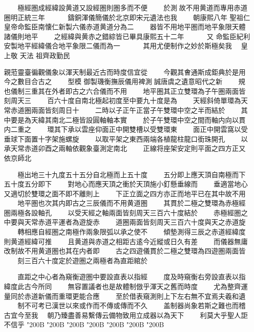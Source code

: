 \begin{正文}
　　極經圏成經緯設黄道又設經圏則圏多而不便
　　於測𠉀故不用黄道而專用赤道圈明正統三年
　　　鑄銅渾儀簡儀於北京即宋元遺法也我
　　朝康熙八年
聖祖仁皇帝命監臣南懐仁新製六儀赤道黄道分為二
　　器皆不用地平圏而地平象限天體諸儀則地平
　　之經緯與黄赤之錯綜皆已畢具康熙五十二年
　　　又
命監臣紀利安製地平經緯儀合地平象限二儀而為一
　　　其用尤便制作之妙於斯極矣我
　皇上敬
天法
祖齊政勤民
\par
親蒞靈臺徧觀儀象以渾天制最近古而時度信宜從
　　今觀其㑹通斯成鉅典於是用今之數目合古之
　　型模
御製璣衡撫辰儀用裨測𠉀誠唐虞之遺意昭代之新
　　規也儀制三重其在外者即古之六合儀而不用
　　地平圏其正立雙環為子午圏兩面皆刻周天三
　　百六十度自南北極起初度至中要九十度是為
　　天經斜倚單環為天常赤道圏兩面皆刻周日十
　　二時以子正午正當子午雙環中空之半而結於
　　其中要是為天緯其南北二極皆設圓軸軸本實
　　於子午雙環中空之間而軸内向以貫内二重之
　　環其下承以雲座仰面正中開雙槽以受雙環東
　　面正中開雲窩以受垂球下面置十字架施螺旋
　　以取平架之東西兩端各植龍柱龍口銜珠開孔
　　以承天常赤道卯酉之兩軸依觀象臺測定南北
　　正線将座架安定則平面之四方正又依京師北
\par
　　極出地三十九度五十五分自北極而上五十度
　　五分即上應天頂自南極而下五十度五分即下
　　對地心而應天頂之衝於天頂施小釘懸垂線而
　　垂適當地心又適切於雙環之面不即不離則上
　　下正立面之四方亦正而地平已在其中故不用
　　地平圏也次其内即古之三辰儀而不用黄道圏
　　其貫於二極之雙環為赤極經圏兩極各設軸孔
　　以受天經之軸兩面皆刻周天三百六十度結於
　　赤極經圏之中要與天常赤道平運者為遊旋赤
　　道圈兩面皆刻周天三百六十度與天之赤道旋
　　轉相應自經圏之南極作兩象限弧以承之使不
　　傾墊測得三辰之赤道經緯度則黄道經緯可推
　　且黄道與赤道之相距古逺今近縱或日久有差
　　而儀器無庸改制故不用黄道圏也其在内者即
　　古之四遊儀貫於二極之雙環為四遊圏兩面皆
　　刻三百六十度定於遊圏之兩極者為直距綰於
\par
　　直距之中心者為窺衡遊圏中要設直表以指經
　　度及時窺衡右旁設直表以指緯度此古今所同
　　無容置議者也是故體制倣乎渾天之舊而時度
　　尤為整齊運量同於赤道新儀而重環更能合應
　　至於借表窺測則上下左右無不宜焉夫羲和遺
　　制不可考已漢世以來或作而不傳或傳而不久
　　盖制器尚象若斯之難也而稽古宜今至我
　朝乃臻盡善易繫傳云備物致用立成器以為天下
　　利莫大乎聖人詎不信乎
\char"200B\relax{}
\char"200B\relax{}
\char"200B\relax{}
\char"200B\relax{}
\char"200B\relax{}
\char"200B\relax{}
\char"200B\relax
\par
\end{正文}\clearpage

